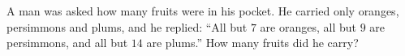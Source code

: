 A man was asked how many fruits were in his pocket. He carried only oranges, persimmons and plums, and he replied: ``All but $7$ are oranges, all but $9$ are persimmons, and all but $14$ are plums.'' How many fruits did he carry?
